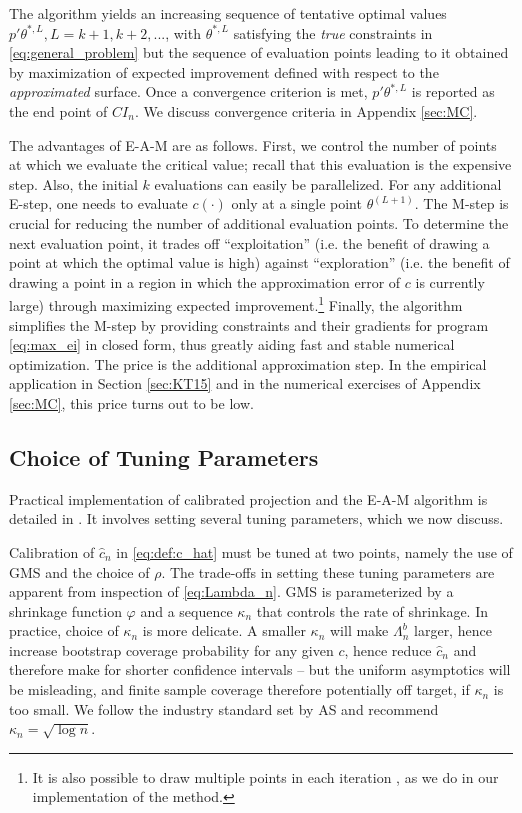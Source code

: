 \documentclass[letterpaper,11pt]{article}
\theoremstyle{myplain}
\theoremstyle{mydefinition}
\theoremstyle{myremark}
\renewcommand{\cite}{\citet}
\numberwithin{equation}{section}
\numberwithin{figure}{section}
\begin{document}
The algorithm yields an increasing sequence of tentative optimal values $p'\theta^{*,L},L=k+1,k+2,...$, with $\theta^{*,L}$ satisfying the \emph{true} constraints in \eqref{eq:general_problem} but the sequence of evaluation points leading to it obtained by maximization of expected improvement defined with respect to the \emph{approximated} surface. Once a convergence criterion is met, $p'\theta^{*,L}$ is reported as the end point of $CI_n$. We discuss convergence criteria in Appendix \ref{sec:MC}.

 The advantages of E-A-M are as follows. First, we control the number of points at which we evaluate the critical value; recall that this evaluation is the expensive step. Also, the initial $k$ evaluations can easily be parallelized. For any additional E-step, one needs to evaluate $c(\cdot)$ only at a single point $\theta^{(L+1)}$.
 The M-step is crucial for reducing the number of additional evaluation points.
  To determine the next evaluation point, it trades off ``exploitation'' (i.e. the benefit of drawing a point at which the optimal value is high) against ``exploration'' (i.e. the benefit of drawing a point in a region in which the approximation error of $c$ is currently large) through maximizing expected improvement.\footnote{It is also possible to draw multiple points in each iteration \citep{Schonlau_Global_1998}, as we do in our implementation of the method.} Finally, the algorithm simplifies the M-step by providing constraints and their gradients for program \eqref{eq:max_ei} in closed form, thus greatly aiding fast and stable numerical optimization. The price is the additional approximation step. In the empirical application in Section \ref{sec:KT15} and in the numerical exercises of Appendix \ref{sec:MC}, this price turns out to be low.
\subsection{Choice of Tuning Parameters}
\label{sec:expl_rho}
Practical implementation of calibrated projection and the E-A-M algorithm is detailed in \cite{KMST_code}. It involves setting several tuning parameters, which we now discuss.

Calibration of $\hat{c}_n$ in \eqref{eq:def:c_hat} must be tuned at two points, namely the use of GMS and the choice of $\rho$. The trade-offs in setting these tuning parameters are apparent from inspection of \eqref{eq:Lambda_n}. GMS is parameterized by a shrinkage function $\varphi$ and a sequence $\kappa_n$ that controls the rate of shrinkage. In practice, choice of $\kappa_n$ is more delicate. A smaller $\kappa_n$ will make $\Lambda_n^b$ larger, hence increase bootstrap coverage probability for any given $c$, hence reduce $\hat{c}_n$ and therefore make for shorter confidence intervals -- but the uniform asymptotics will be misleading, and finite sample coverage therefore potentially off target, if $\kappa_n$ is too small. We follow the industry standard set by AS and recommend $\kappa_n=\sqrt{\log n}$.
\end{document}
